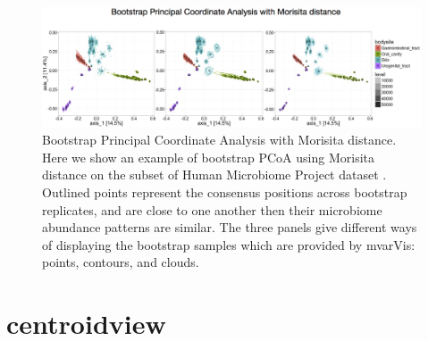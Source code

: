 \begin{figure}[ht]
  \centering
  \includegraphics[width=\textwidth]{figure/treelapse/hmp_bootstrap}
  \caption{
    Bootstrap Principal Coordinate Analysis with Morisita distance. Here we show
    an example of bootstrap PCoA using Morisita distance on the subset of Human
    Microbiome Project dataset \citep{human2012structure}. Outlined points
    represent the consensus positions across bootstrap replicates, and are close
    to one another then their microbiome abundance patterns are similar. The
    three panels give different ways of displaying the bootstrap samples which
    are provided by mvarVis: points, contours, and clouds.
    \label{fig:hmp_bootstrap}
  }
\end{figure}

\section{centroidview}

